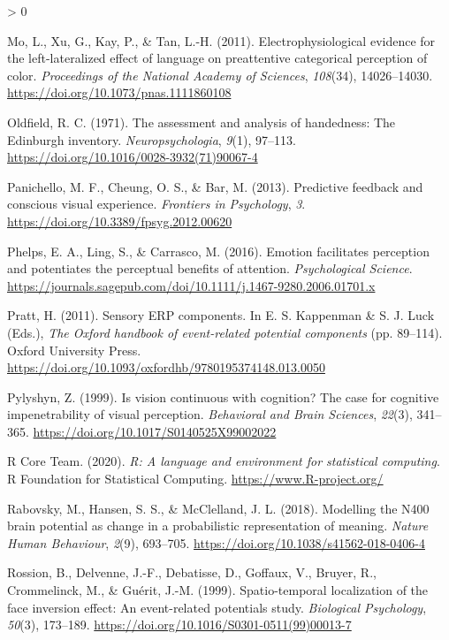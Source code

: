 \documentclass[
  english,
  man,floatsintext]{apa7}
\newlength{\cslhangindent}
\newenvironment{CSLReferences}[2] %
 {%
  \setlength{\parindent}{0pt}
  \ifodd #1 \everypar{\setlength{\hangindent}{\cslhangindent}}\ignorespaces\fi
  \ifnum #2 > 0
  \setlength{\parskip}{#2\baselineskip}
  \fi
 }%
 {}
\begin{document}
\begin{CSLReferences}{1}{0}
\leavevmode\hypertarget{ref-mo2011}{}%
Mo, L., Xu, G., Kay, P., \& Tan, L.-H. (2011). Electrophysiological evidence for the left-lateralized effect of language on preattentive categorical perception of color. \emph{Proceedings of the National Academy of Sciences}, \emph{108}(34), 14026--14030. \url{https://doi.org/10.1073/pnas.1111860108}

\leavevmode\hypertarget{ref-oldfield1971}{}%
Oldfield, R. C. (1971). The assessment and analysis of handedness: The {Edinburgh} inventory. \emph{Neuropsychologia}, \emph{9}(1), 97--113. \url{https://doi.org/10.1016/0028-3932(71)90067-4}

\leavevmode\hypertarget{ref-panichello2013}{}%
Panichello, M. F., Cheung, O. S., \& Bar, M. (2013). Predictive feedback and conscious visual experience. \emph{Frontiers in Psychology}, \emph{3}. \url{https://doi.org/10.3389/fpsyg.2012.00620}

\leavevmode\hypertarget{ref-phelps2016}{}%
Phelps, E. A., Ling, S., \& Carrasco, M. (2016). Emotion facilitates perception and potentiates the perceptual benefits of attention. \emph{Psychological Science}. \url{https://journals.sagepub.com/doi/10.1111/j.1467-9280.2006.01701.x}

\leavevmode\hypertarget{ref-pratt2011}{}%
Pratt, H. (2011). Sensory ERP components. In E. S. Kappenman \& S. J. Luck (Eds.), \emph{The {Oxford handbook} of event-related potential components} (pp. 89--114). Oxford University Press. \url{https://doi.org/10.1093/oxfordhb/9780195374148.013.0050}

\leavevmode\hypertarget{ref-pylyshyn1999}{}%
Pylyshyn, Z. (1999). Is vision continuous with cognition? The case for cognitive impenetrability of visual perception. \emph{Behavioral and Brain Sciences}, \emph{22}(3), 341--365. \url{https://doi.org/10.1017/S0140525X99002022}

\leavevmode\hypertarget{ref-R-base}{}%
R Core Team. (2020). \emph{R: A language and environment for statistical computing}. R Foundation for Statistical Computing. \url{https://www.R-project.org/}

\leavevmode\hypertarget{ref-rabovsky2018}{}%
Rabovsky, M., Hansen, S. S., \& McClelland, J. L. (2018). Modelling the {N400} brain potential as change in a probabilistic representation of meaning. \emph{Nature Human Behaviour}, \emph{2}(9), 693--705. \url{https://doi.org/10.1038/s41562-018-0406-4}

\leavevmode\hypertarget{ref-rossion1999}{}%
Rossion, B., Delvenne, J.-F., Debatisse, D., Goffaux, V., Bruyer, R., Crommelinck, M., \& Guérit, J.-M. (1999). Spatio-temporal localization of the face inversion effect: An event-related potentials study. \emph{Biological Psychology}, \emph{50}(3), 173--189. \url{https://doi.org/10.1016/S0301-0511(99)00013-7}


\end{CSLReferences}
\end{document}
